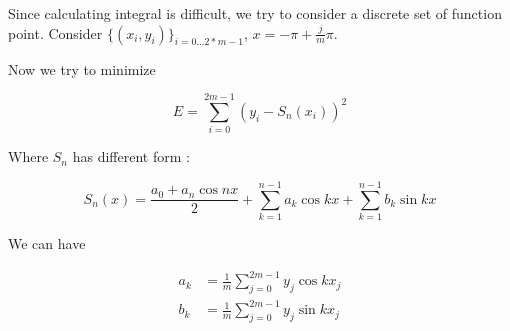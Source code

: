 Since calculating integral is difficult,
we try to consider a discrete set of function point.
Consider $\{(x_i, y_i)\}_{i=0...2*m-1}$,
$x = -\pi + \frac{j}{m}\pi$.

Now we try to minimize

\[
  E = \sum_{i=0}^{2m-1} (y_i - S_n(x_i))^2
\]

Where $S_n$ has different form :

\[
  S_n(x) = \frac{a_0 + a_n \cos nx}{2} + \sum_{k=1}^{n-1} a_k \cos kx + \sum_{k=1}^{n-1} b_k \sin kx
\]

We can have

\begin{align}
  a_k &= \frac{1}{m}\sum_{j=0}^{2m-1} y_j \cos kx_j \nonumber \\
  b_k &= \frac{1}{m}\sum_{j=0}^{2m-1} y_j \sin kx_j \nonumber
\end{align}
